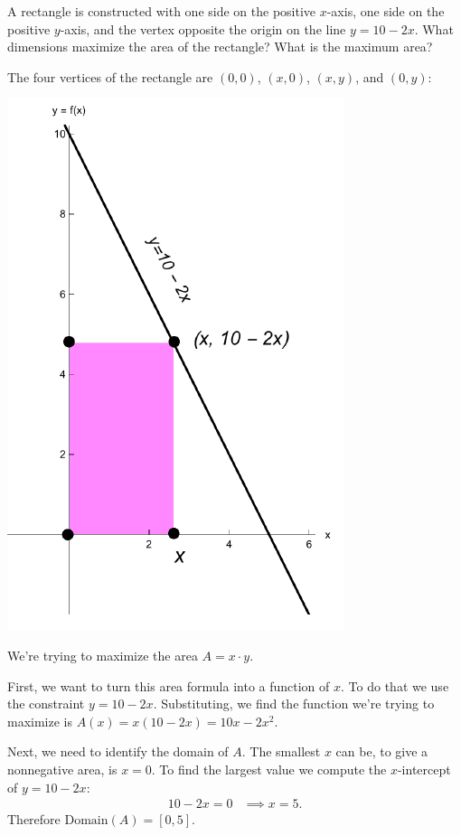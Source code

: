 \documentclass[nooutcomes]{ximera}
\begin{document}
\begin{problem}
  A rectangle is constructed with one side on the positive $x$-axis, one side on the positive $y$-axis, and the vertex opposite the origin on the line $y=10-2x$.
  What dimensions maximize the area of the rectangle?
  What is the maximum area?
  \begin{freeResponse}
    The four vertices of the rectangle are $(0, 0)$, $(x, 0)$, $(x, y)$, and $(0, y)$:
    \begin{center}
      \includegraphics[scale = .5]{Images/figure8.png}
    \end{center}
    We're trying to maximize the area $A = x \cdot y$.

    First, we want to turn this area formula into a function of $x$.
    To do that we use the constraint $y = 10 - 2x$.
    Substituting, we find the function we're trying to maximize is $A(x) = x (10 - 2x) = 10x - 2x^2$.

    Next, we need to identify the domain of $A$.
    The smallest $x$ can be, to give a nonnegative area, is $x = 0$.
    To find the largest value we compute the $x$-intercept of $y = 10 - 2x$:
    \begin{align*}
      10 - 2x = 0 &\implies x = 5.
    \end{align*}
    Therefore $\mathrm{Domain}(A) = [0, 5]$.


\end{freeResponse}
\end{problem}
\end{document}
